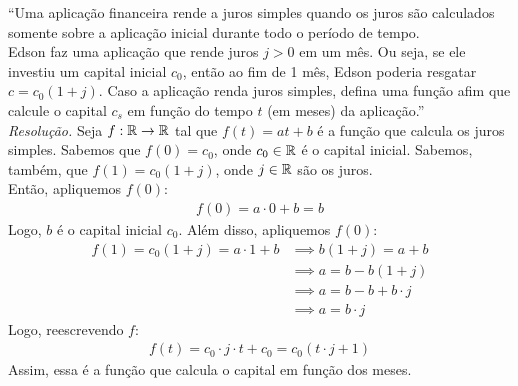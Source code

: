 \enquote{Uma aplicação financeira rende a juros simples quando os juros são calculados somente sobre a aplicação inicial durante todo o período de tempo. \\
Edson faz uma aplicação que rende juros $j > 0$ em um mês. Ou seja, se ele investiu um capital inicial $c_0$, então ao fim de 1 mês, Edson poderia resgatar $c = c_0(1 + j)$. Caso a aplicação renda juros simples, defina uma função afim que calcule o capital $c_s$ em função do tempo $t$ (em meses) da aplicação.} \\
\emph{Resolução.} Seja $f: \mathbb R \rightarrow \mathbb R$ tal que $f(t) = at + b$ é a função que calcula os juros simples. Sabemos que $f(0) = c_0$, onde $c_0 \in \mathbb R$ é o capital inicial. Sabemos, também, que $f(1) = c_0(1 + j)$, onde $j \in \mathbb R$ são os juros. \\
Então, apliquemos $f(0)$:
\begin{align*}
    f(0) = a \cdot 0 + b = b
\end{align*}
Logo, $b$ é o capital inicial $c_0$.
Além disso, apliquemos $f(0)$:
\begin{align*}
    f(1) = c_0(1 + j) = a \cdot 1 + b & \implies b(1 + j) = a + b \\ & \implies
    a = b - b(1 + j) \\ & \implies
    a = b - b + b \cdot j \\ &\implies
    a = b \cdot j
\end{align*} 
Logo, reescrevendo $f$:
\begin{align*}
    f(t) = c_0 \cdot j \cdot t + c_0 = c_0(t \cdot j + 1)
\end{align*}
Assim, essa é a função que calcula o capital em função dos meses.
